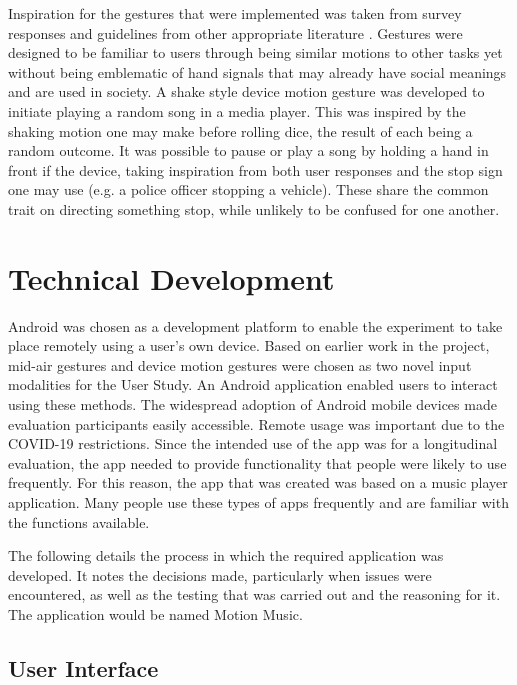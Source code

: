 \documentclass{l4proj}
\begin{document}
Inspiration for the gestures that were implemented was taken from survey responses and guidelines from other appropriate literature \citep{rico_usable_2010}. Gestures were designed to be familiar to users through being similar motions to other tasks yet without being emblematic of hand signals that may already have social meanings and are used in society. A shake style device motion gesture was developed to initiate playing a random song in a media player. This was inspired by the shaking motion one may make before rolling dice, the result of each being a random outcome. It was possible to pause or play a song by holding a hand in front if the device, taking inspiration from both user responses and the stop sign one may use (e.g. a police officer stopping a vehicle). These share the common trait on directing something stop, while unlikely to be confused for one another.


\chapter{Technical Development}

Android was chosen as a development platform to enable the experiment to take place remotely using a user's own device. Based on earlier work in the project, mid-air gestures and device motion gestures were chosen as two novel input modalities for the User Study. An Android application enabled users to interact using these methods. The widespread adoption of Android mobile devices made evaluation participants easily accessible. Remote usage was important due to the COVID-19 restrictions. Since the intended use of the app was for a longitudinal evaluation, the app needed to provide functionality that people were likely to use frequently. For this reason, the app that was created was based on a music player application. Many people use these types of apps frequently and are familiar with the functions available. 

The following details the process in which the required application was developed. It notes the decisions made, particularly when issues were encountered, as well as the testing that was carried out and the reasoning for it. The application would be named Motion Music.


\section{User Interface}
\end{document}
